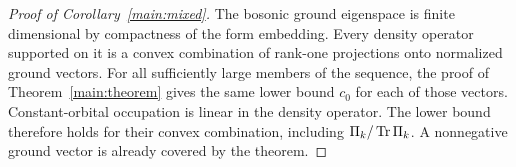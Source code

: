 \begin{proof}[Proof of Corollary~\ref{main:mixed}]
The bosonic ground eigenspace is finite dimensional by compactness of
the form embedding. Every density operator supported on it is a convex
combination of rank-one projections onto normalized ground vectors.
For all sufficiently large members of the sequence, the proof of
Theorem~\ref{main:theorem} gives the same lower bound $c_0$ for each
of those vectors. Constant-orbital occupation is linear in the density
operator. The lower bound therefore holds for their convex combination,
including $\Pi_k/\operatorname{Tr}\Pi_k$. A nonnegative ground vector is already
covered by the theorem.
\end{proof}
